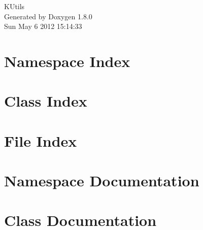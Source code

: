 \documentclass{book}
\begin{document}
\hypersetup{pageanchor=false,citecolor=blue}
\begin{titlepage}
\vspace*{7cm}
\begin{center}
{\Large K\-Utils }\\
\vspace*{1cm}
{\large Generated by Doxygen 1.8.0}\\
\vspace*{0.5cm}
{\small Sun May 6 2012 15:14:33}\\
\end{center}
\end{titlepage}
\clearemptydoublepage
{}
\tableofcontents
\clearemptydoublepage
{}
\hypersetup{pageanchor=true,citecolor=blue}
\chapter{Namespace Index}

\chapter{Class Index}

\chapter{File Index}

\chapter{Namespace Documentation}























\chapter{Class Documentation}


















\end{document}
